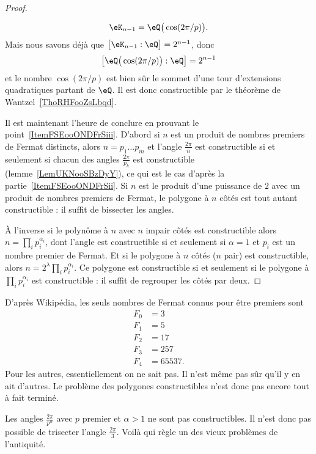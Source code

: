 \begin{proof}
\begin{subproof}
\begin{subproof}
\begin{equation}
                            \eK_{n-1}=\eQ\big( \cos(2\pi/p) \big).
                        \end{equation}
                        Mais nous savons déjà que \( \big[ \eK_{n-1}:\eQ \big]=2^{n-1}\), donc
                        \begin{equation}
                            \big[ \eQ\big( \cos(2\pi/p) \big):\eQ \big]=2^{n-1}
                        \end{equation}
                        et le nombre \( \cos(2\pi/p)\) est bien sûr le sommet d'une tour d'extensions quadratiques partant de \( \eQ\). Il est donc constructible par le théorème de Wantzel~\ref{ThoRHFooZsLbqd}.
            \end{subproof}
    \end{subproof}

    Il est maintenant l'heure de conclure en prouvant le point~\ref{ItemFSEooONDFrSiii}. D'abord si \( n\) est un produit de nombres premiers de Fermat distincts, alors \( n=p_1\ldots p_m\) et l'angle \( \frac{ 2\pi }{ n }\) est constructible si et seulement si chacun des angles \( \frac{ 2\pi }{ p_k }\) est constructible (lemme~\ref{LemUKNooSBzDyY}), ce qui est le cas d'après la partie~\ref{ItemFSEooONDFrSii}. Si \( n\) est le produit d'une puissance de \( 2\) avec un produit de nombres premiers de Fermat, le polygone à \( n\) côtés est tout autant constructible : il suffit de bissecter les angles.

    À l'inverse si le polynôme à \( n\) avec \( n\) impair côtés est constructible alors \( n=\prod_ip_i^{\alpha_i}\), dont l'angle est constructible si et seulement si \( \alpha=1\) et \( p_i\) est un nombre premier de Fermat. Et si le polygone à \( n\) côtés (\( n\) pair) est constructible, alors \( n=2^{\lambda}\prod_ip_i^{\alpha_i}\). Ce polygone est constructible si et seulement si le polygone à \( \prod_ip_i^{\alpha_i}\) est constructible : il suffit de regrouper les côtés par deux.

\end{proof}

\begin{remark}
    D'après Wikipédia\cite{PLQooFQtjyR}, les seuls nombres de Fermat connus pour être premiers sont
    \begin{subequations}
        \begin{align}
            F_0&=3\\
            F_1&=5\\
            F_2&=17\\
            F_3&=257\\
            F_4&=65537.
        \end{align}
    \end{subequations}
    Pour les autres, essentiellement on ne sait pas. Il n'est même pas sûr qu'il y en ait d'autres. Le problème des polygones constructibles n'est donc pas encore tout à fait terminé.
\end{remark}

\begin{remark}
    Les angles \( \frac{ 2\pi }{ p^{\alpha} }\) avec \( p\) premier et \( \alpha>1\) ne sont pas constructibles. Il n'est donc pas possible de trisecter l'angle \( \frac{ 2\pi }{ 3 }\). Voilà qui règle un des vieux problèmes de l'antiquité.
\end{remark}
